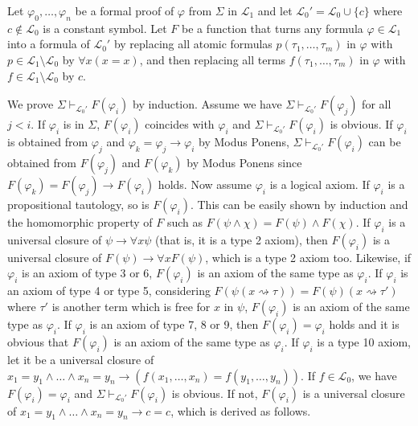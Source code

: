 \documentclass[12pt]{article}
\theoremstyle{definition}
\newenvironment{customthm}[1]
  {\renewcommand\theinnercustomthm{#1}\innercustomthm}
  {\endinnercustomthm}
\begin{document}
\begin{customthm}{II.11.13} Let $\varphi_0,\ldots,\varphi_n$ be a formal proof of $\varphi$ from $\Sigma$ in $\mathcal{L}_1$ and let $\mathcal{L}_0'=\mathcal{L}_0\cup\{c\}$ where $c\not\in\mathcal{L}_0$ is a constant symbol. Let $F$ be a function that turns any formula $\varphi\in\mathcal{L}_1$
into a formula of $\mathcal{L}_0'$ by replacing all atomic formulas $p(\tau_1,\ldots,\tau_m)$ in $\varphi$ with $p\in\mathcal{L}_1\setminus\mathcal{L}_0$ by $\forall x(x=x)$, and then replacing all terms $f(\tau_1,\ldots,\tau_m)$ in $\varphi$ with $f\in\mathcal{L}_1\setminus\mathcal{L}_0$ by $c$.

We prove $\Sigma\vdash_{\mathcal{L}_0'}F(\varphi_i)$ by induction. Assume we have $\Sigma\vdash_{\mathcal{L}_0'}F(\varphi_j)$ for all $j<i$. If $\varphi_i$ is in $\Sigma$, $F(\varphi_i)$ coincides with $\varphi_i$ and $\Sigma\vdash_{\mathcal{L}_0'}F(\varphi_i)$ is obvious. If $\varphi_i$ is obtained from $\varphi_j$ and $\varphi_k=\varphi_j\rightarrow\varphi_i$ by Modus Ponens, $\Sigma\vdash_{\mathcal{L}_0'}F(\varphi_i)$ can be obtained from $F(\varphi_j)$ and $F(\varphi_k)$ by Modus Ponens since $F(\varphi_k)=F(\varphi_j)\rightarrow F(\varphi_i)$ holds. Now assume $\varphi_i$ is a logical axiom. If $\varphi_i$ is a propositional tautology, so is $F(\varphi_i)$. This can be easily shown by induction and the homomorphic property of $F$ such as $F(\psi\wedge\chi)=F(\psi)\wedge F(\chi)$. If $\varphi_i$ is a universal closure of $\psi\rightarrow\forall x\psi$ (that is, it is a type 2 axiom), then $F(\varphi_i)$ is a universal closure of $F(\psi)\rightarrow\forall xF(\psi)$, which is a type 2 axiom too. Likewise, if $\varphi_i$ is an axiom of type 3 or 6, $F(\varphi_i)$ is an axiom of the same type as $\varphi_i$. If $\varphi_i$ is an axiom of type 4 or type 5, considering $F(\psi(x\rightsquigarrow\tau))=F(\psi)(x\rightsquigarrow\tau')$ where $\tau'$ is another term which is free for $x$ in $\psi$, $F(\varphi_i)$ is an axiom of the same type as $\varphi_i$. If $\varphi_i$ is an axiom of type 7, 8 or 9, then $F(\varphi_i)=\varphi_i$ holds and it is obvious that $F(\varphi_i)$ is an axiom of the same type as $\varphi_i$. If $\varphi_i$ is a type 10 axiom, let it be a universal closure of $x_1=y_1\wedge\ldots\wedge x_n=y_n\rightarrow(f(x_1,\ldots,x_n)=f(y_1,\ldots,y_n))$. If $f\in\mathcal{L}_0$, we have $F(\varphi_i)=\varphi_i$ and
$\Sigma\vdash_{\mathcal{L}_0'}F(\varphi_i)$ is obvious. If not, $F(\varphi_i)$ is a universal closure of $x_1=y_1\wedge\ldots\wedge x_n=y_n\rightarrow c=c$, which is derived as follows.

\end{customthm}
\end{document}

